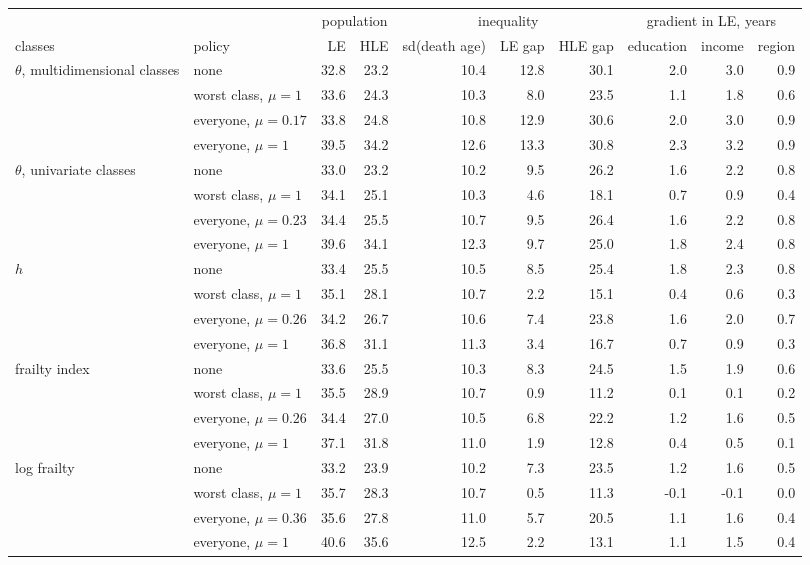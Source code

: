 \begin{tabular}{llrrrrrrrr}
\toprule
 & & \multicolumn{2}{c}{population} & \multicolumn{3}{c}{inequality} & \multicolumn{3}{c}{gradient in LE, years} \\
\cmidrule(lr){3-4} \cmidrule(lr){5-7} \cmidrule(lr){8-10}
classes & policy & LE & HLE & sd(death age) & LE gap & HLE gap & education & income & region \\
\midrule
$\theta$, multidimensional classes & none & 32.8 & 23.2 & 10.4 & 12.8 & 30.1 & 2.0 & 3.0 & 0.9 \\
 & worst class, $\mu=1$ & 33.6 & 24.3 & 10.3 & 8.0 & 23.5 & 1.1 & 1.8 & 0.6 \\
 & everyone, $\mu=0.17$ & 33.8 & 24.8 & 10.8 & 12.9 & 30.6 & 2.0 & 3.0 & 0.9 \\
 & everyone, $\mu=1$ & 39.5 & 34.2 & 12.6 & 13.3 & 30.8 & 2.3 & 3.2 & 0.9 \\
\addlinespace
$\theta$, univariate classes & none & 33.0 & 23.2 & 10.2 & 9.5 & 26.2 & 1.6 & 2.2 & 0.8 \\
 & worst class, $\mu=1$ & 34.1 & 25.1 & 10.3 & 4.6 & 18.1 & 0.7 & 0.9 & 0.4 \\
 & everyone, $\mu=0.23$ & 34.4 & 25.5 & 10.7 & 9.5 & 26.4 & 1.6 & 2.2 & 0.8 \\
 & everyone, $\mu=1$ & 39.6 & 34.1 & 12.3 & 9.7 & 25.0 & 1.8 & 2.4 & 0.8 \\
\addlinespace
$h$ & none & 33.4 & 25.5 & 10.5 & 8.5 & 25.4 & 1.8 & 2.3 & 0.8 \\
 & worst class, $\mu=1$ & 35.1 & 28.1 & 10.7 & 2.2 & 15.1 & 0.4 & 0.6 & 0.3 \\
 & everyone, $\mu=0.26$ & 34.2 & 26.7 & 10.6 & 7.4 & 23.8 & 1.6 & 2.0 & 0.7 \\
 & everyone, $\mu=1$ & 36.8 & 31.1 & 11.3 & 3.4 & 16.7 & 0.7 & 0.9 & 0.3 \\
\addlinespace
frailty index & none & 33.6 & 25.5 & 10.3 & 8.3 & 24.5 & 1.5 & 1.9 & 0.6 \\
 & worst class, $\mu=1$ & 35.5 & 28.9 & 10.7 & 0.9 & 11.2 & 0.1 & 0.1 & 0.2 \\
 & everyone, $\mu=0.26$ & 34.4 & 27.0 & 10.5 & 6.8 & 22.2 & 1.2 & 1.6 & 0.5 \\
 & everyone, $\mu=1$ & 37.1 & 31.8 & 11.0 & 1.9 & 12.8 & 0.4 & 0.5 & 0.1 \\
\addlinespace
log frailty & none & 33.2 & 23.9 & 10.2 & 7.3 & 23.5 & 1.2 & 1.6 & 0.5 \\
 & worst class, $\mu=1$ & 35.7 & 28.3 & 10.7 & 0.5 & 11.3 & -0.1 & -0.1 & 0.0 \\
 & everyone, $\mu=0.36$ & 35.6 & 27.8 & 11.0 & 5.7 & 20.5 & 1.1 & 1.6 & 0.4 \\
 & everyone, $\mu=1$ & 40.6 & 35.6 & 12.5 & 2.2 & 13.1 & 1.1 & 1.5 & 0.4 \\
\bottomrule
\end{tabular}
